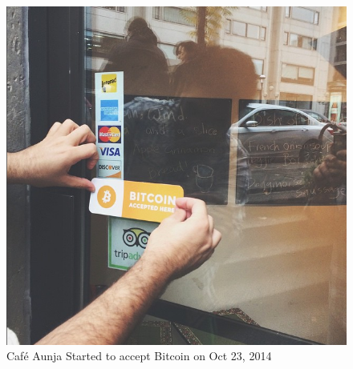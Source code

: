 \begin{figure}[htb]
\centering
\includegraphics[scale=0.5]{fig/cafeaunja.png}
  \caption{Caf\'{e} Aunja Started to accept Bitcoin on Oct 23, 2014 }
\label{fig:cafeaunja}
\end{figure}




